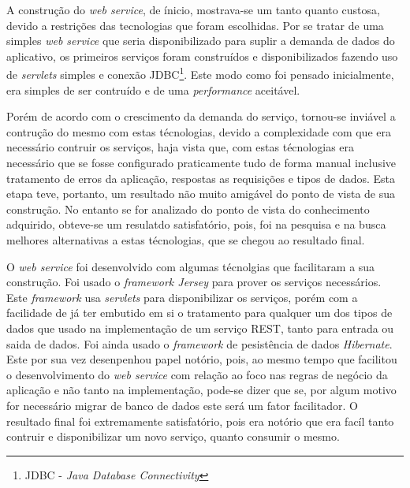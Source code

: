 	\par A construção do \textit{web service}, de ínicio, mostrava-se um tanto
quanto custosa, devido a restrições das tecnologias que foram escolhidas. Por se
tratar de uma simples \textit{web service} que seria disponibilizado para suplir
a demanda de dados do aplicativo, os primeiros serviços foram construídos e
disponibilizados fazendo uso de \textit{servlets} simples e conexão
JDBC\footnote{JDBC - \textit{Java Database Connectivity}}. Este modo como foi
pensado inicialmente, era simples de ser contruído e de uma
\textit{performance} aceitável. 

	\par Porém de acordo com o crescimento da demanda do serviço, tornou-se
inviável a contrução do mesmo com estas técnologias, devido a complexidade com
que era necessário contruir os serviços, haja vista que, com estas técnologias
era necessário que se fosse configurado praticamente tudo de forma manual
inclusive tratamento de erros da aplicação, respostas as requisições e tipos de
dados. Esta etapa teve, portanto, um resultado não muito amigável do ponto de
vista de sua construção. No entanto se for analizado do ponto de vista do
conhecimento adquirido, obteve-se um resulatdo satisfatório, pois, foi na
pesquisa e na busca melhores alternativas a estas técnologias, que se chegou ao
resultado final.

	\par O \textit{web service} foi desenvolvido com algumas técnolgias que
facilitaram a sua construção. Foi usado o \textit{framework Jersey} para prover
os serviços necessários. Este \textit{framework} usa \textit{servlets} para
disponibilizar os serviços, porém com a facilidade de já ter embutido em si o
tratamento para qualquer um dos tipos de dados que usado na implementação de um
serviço REST, tanto para entrada ou saida de dados. Foi ainda usado o
\textit{framework} de pesistência de dados \textit{Hibernate}. Este por sua vez
desenpenhou papel notório, pois, ao mesmo tempo que facilitou o desenvolvimento
do \textit{web service} com relação ao foco nas regras de negócio da aplicação e
não tanto na implementação, pode-se dizer que se, por algum motivo for
necessário migrar de banco de dados este será um fator facilitador. O resultado
final foi extremamente satisfatório, pois era notório que era facíl tanto
contruir e disponibilizar um novo serviço, quanto consumir o mesmo.

